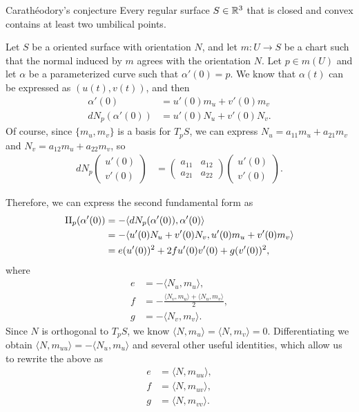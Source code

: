 \begin{conjecture}{Carath\'eodory's conjecture}\proofbreak
    Every regular surface $S \in \mathbb{R}^3$ that is closed and convex contains at least two umbilical points.
\end{conjecture}

Let $S$ be a oriented surface with orientation $N$, and let $m: U \to S$ be a chart such that the normal induced by $m$ agrees with the orientation $N$. Let $p \in m(U)$ and let $\alpha$ be a parameterized curve such that $\alpha'(0) = p$. We know that $\alpha(t)$ can be expressed as $(u(t), v(t))$, and then
\begin{align*}
    \alpha'(0) &= u'(0)m_u + v'(0)m_v \\
    dN_p(\alpha'(0)) &= u'(0)N_u + v'(0)N_v.
\end{align*}
Of course, since $\{m_u, m_v\}$ is a basis for $T_pS$, we can express $N_u = a_{11}m_u + a_{21}m_v$ and $N_v = a_{12}m_u + a_{22}m_v$, so
\begin{align*}
    dN_p\begin{pmatrix}
        u'(0) \\ v'(0)
    \end{pmatrix} &= \begin{pmatrix}
        a_{11} & a_{12} \\
        a_{21} & a_{22}
    \end{pmatrix}\begin{pmatrix}
        u'(0) \\ v'(0)
    \end{pmatrix}.
\end{align*}

Therefore, we can express the second fundamental form as
\begin{align*}
    \operatorname{II}_p(\alpha'(0)) &= -\langle dN_p(\alpha'(0)), \alpha'(0)\rangle \\
    &= -\langle u'(0)N_u + v'(0)N_v, u'(0)m_u + v'(0)m_v \rangle \\
    &= e(u'(0))^2 + 2fu'(0)v'(0) + g(v'(0))^2,
\end{align*}
where
\begin{align*}
    e &= -\langle N_u, m_u \rangle, \\
    f &= -\frac{\langle N_v, m_u\rangle + \langle N_u, m_v\rangle}{2}, \\
    g &= -\langle N_v, m_v \rangle.
\end{align*}
Since $N$ is orthogonal to $T_pS$, we know $\langle N, m_u\rangle = \langle N, m_v\rangle = 0$. Differentiating we obtain $\langle N, m_{uu}\rangle = -\langle N_u, m_u\rangle$ and several other useful identities, which allow us to rewrite the above as
\begin{align*}
    e &= \langle N, m_{uu}\rangle, \\
    f &= \langle N, m_{uv}\rangle, \\
    g &= \langle N, m_{vv}\rangle.
\end{align*}

